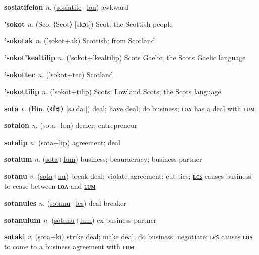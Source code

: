 \textbf{\hypertarget{sosiatifelon}{sosiatifelon}} \textit{n.} (\hyperlink{sosiatife}{sosiatife}+\allowbreak \hyperlink{lon}{lon})
awkward

\textbf{\hypertarget{'sokot}{'sokot}} \textit{n.} (Sco. ⟨Scot⟩ [skɔt])
Scot; the Scottish people

\textbf{\hypertarget{'sokotak}{'sokotak}} \textit{n.} (\hyperlink{'sokot}{'sokot}+\allowbreak \hyperlink{ak}{ak})
Scottish; from Scotland

\textbf{\hypertarget{'sokot'kealtilip}{'sokot'kealtilip}} \textit{n.} (\hyperlink{'sokot}{'sokot}+\allowbreak \hyperlink{'kealtilip}{'kealtilip})
Scots Gaelic; the Scots Gaelic language

\textbf{\hypertarget{'sokottec}{'sokottec}} \textit{n.} (\hyperlink{'sokot}{'sokot}+\allowbreak \hyperlink{tec}{tec})
Scotland

\textbf{\hypertarget{'sokottilip}{'sokottilip}} \textit{n.} (\hyperlink{'sokot}{'sokot}+\allowbreak \hyperlink{tilip}{tilip})
Scots; Lowland Scots; the Scots language

\textbf{\hypertarget{sota}{sota}} \textit{v.} (Hin. ⟨{\devanagari{}सौदा}⟩ [sɔːdaː])
deal; have deal; do business; \hyperlink{sotalon}{ʟᴏᴧ} has a deal with \hyperlink{sotalum}{ʟᴜᴍ}

\textbf{\hypertarget{sotalon}{sotalon}} \textit{n.} (\hyperlink{sota}{sota}+\allowbreak \hyperlink{lon}{lon})
dealer; entrepreneur

\textbf{\hypertarget{sotalip}{sotalip}} \textit{n.} (\hyperlink{sota}{sota}+\allowbreak \hyperlink{lip}{lip})
agreement; deal

\textbf{\hypertarget{sotalum}{sotalum}} \textit{n.} (\hyperlink{sota}{sota}+\allowbreak \hyperlink{lum}{lum})
business; beauracracy; business partner

\textbf{\hypertarget{sotanu}{sotanu}} \textit{v.} (\hyperlink{sota}{sota}+\allowbreak \hyperlink{nu}{nu})
break deal; violate agreement; cut ties; \hyperlink{sotanules}{ʟєꜱ} causes business to cease between ʟᴏᴧ and \hyperlink{sotanulum}{ʟᴜᴍ}

\textbf{\hypertarget{sotanules}{sotanules}} \textit{n.} (\hyperlink{sotanu}{sotanu}+\allowbreak \hyperlink{les}{les})
deal breaker

\textbf{\hypertarget{sotanulum}{sotanulum}} \textit{n.} (\hyperlink{sotanu}{sotanu}+\allowbreak \hyperlink{lum}{lum})
ex-business partner

\textbf{\hypertarget{sotaki}{sotaki}} \textit{v.} (\hyperlink{sota}{sota}+\allowbreak \hyperlink{ki}{ki})
strike deal; make deal; do business; negotiate; \hyperlink{sotakiles}{ʟєꜱ} causes ʟᴏᴧ to come to a business agreement with ʟᴜᴍ

